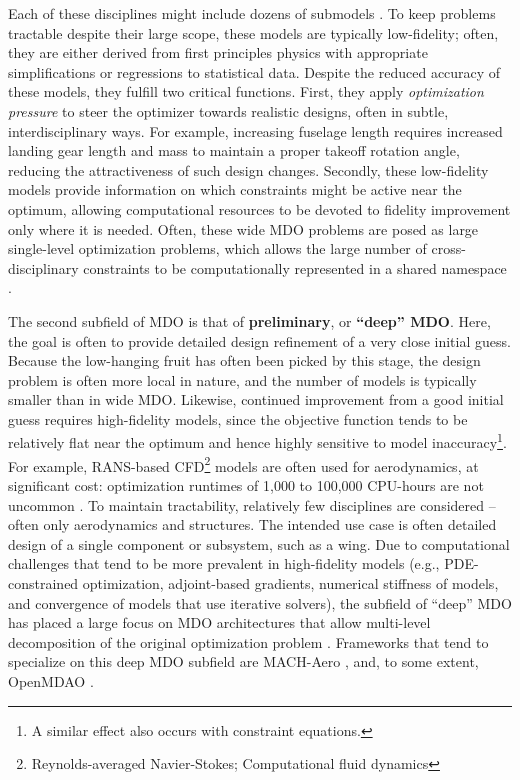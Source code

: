 Each of these disciplines might include dozens of submodels \cite{cruz_weight_1989, torenbeek_synthesis_1976, torenbeek_advanced_2013, drela_tasopt_2010}. To keep problems tractable despite their large scope, these models are typically low-fidelity; often, they are either derived from first principles physics with appropriate simplifications or regressions to statistical data. Despite the reduced accuracy of these models, they fulfill two critical functions. First, they apply \textit{optimization pressure} to steer the optimizer towards realistic designs, often in subtle, interdisciplinary ways. For example, increasing fuselage length requires increased landing gear length and mass to maintain a proper takeoff rotation angle, reducing the attractiveness of such design changes. Secondly, these low-fidelity models provide information on which constraints might be active near the optimum, allowing computational resources to be devoted to fidelity improvement only where it is needed. Often, these wide MDO problems are posed as large single-level optimization problems, which allows the large number of cross-disciplinary constraints to be computationally represented in a shared namespace \cite{hoburg_geometric_2014}.

The second subfield of MDO is that of \textbf{preliminary}, or \textbf{``deep'' MDO}. Here, the goal is often to provide detailed design refinement of a very close initial guess. Because the low-hanging fruit has often been picked by this stage, the design problem is often more local in nature, and the number of models is typically smaller than in wide MDO. Likewise, continued improvement from a good initial guess requires high-fidelity models, since the objective function tends to be relatively flat near the optimum and hence highly sensitive to model inaccuracy\footnote{A similar effect also occurs with constraint equations.}. For example, RANS-based CFD\footnote{Reynolds-averaged Navier-Stokes; Computational fluid dynamics} models are often used for aerodynamics, at significant cost: optimization runtimes of 1,000 to 100,000 CPU-hours are not uncommon \cite{kenway_multipoint_2014}. To maintain tractability, relatively few disciplines are considered -- often only aerodynamics and structures. The intended use case is often detailed design of a single component or subsystem, such as a wing. Due to computational challenges that tend to be more prevalent in high-fidelity models (e.g., PDE-constrained optimization, adjoint-based gradients, numerical stiffness of models, and convergence of models that use iterative solvers), the subfield of ``deep'' MDO has placed a large focus on MDO architectures that allow multi-level decomposition of the original optimization problem \cite{martins_multidisciplinary_2013}. Frameworks that tend to specialize on this deep MDO subfield are MACH-Aero \cite{he_aerodynamic_2018}, and, to some extent, OpenMDAO \cite{gray_openmdao_2019}.

